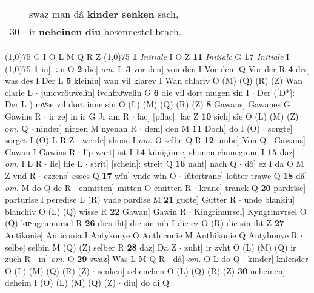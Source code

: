 \documentclass[8pt,a4paper,notitlepage]{article}
\begin{document}
\begin{table}[ht]
\begin{minipage}[t]{0.5\linewidth}
\begin{tabular}{rl}
 & swaz man dâ \textbf{kinder senken} sach,\\ 
30 & ir \textbf{neheinen} \textbf{diu} hosennestel brach.\\ 
\end{tabular}
\scriptsize
\line(1,0){75} \newline
G I O L M Q R Z \newline
\line(1,0){75} \newline
\textbf{1} \textit{Initiale} I O Z  \textbf{11} \textit{Initiale} G  \textbf{17} \textit{Initiale} I  \newline
\line(1,0){75} \newline
\textbf{1} in] ÷n O \textbf{2} die] \textit{om.} L \textbf{3} vor den] von den I Vor dem Q Vor der R \textbf{4} des] was des I Der L \textbf{5} kleiniu] wan vil klarev I Wan chlariv O (M) (Q) (R) (Z) Wan clarie L  $\cdot$ juncvröuwelîn] ivchfroͮwelin G \textbf{6} die vil dort mugen sin I  $\cdot$ Der ([D*]: Der L ) mvͦse vil dort inne sin O (L) (M) (Q) (R) (Z) \textbf{8} Gawans] Gawanes G Gawins R  $\cdot$ ir ze] in ir G Jr am R  $\cdot$ lac] [pflac]: lac Z \textbf{10} sich] sîe O (L) (M) (Z) o\textit{m. } Q  $\cdot$ ninder] nirgen M nyenan R  $\cdot$ dem] den M \textbf{11} Doch] do I (O)  $\cdot$ sorgte] sorget I (O) L R Z  $\cdot$ werde] shone I \textit{om.} O selbe Q R \textbf{12} umbe] Von Q  $\cdot$ Gawans] Gawan I Gawins R  $\cdot$ lîp wart] ist I \textbf{14} küniginne] shonen chuneginne I \textbf{15} daz] \textit{om.} I L R  $\cdot$ lie] hie L  $\cdot$ strît] [schein]: streit Q \textbf{16} naht] nach Q  $\cdot$ dô] ez I da O M Z vnd R  $\cdot$ ezzens] esses Q \textbf{17} wîn] vnde win O  $\cdot$ lûtertranc] loűter trawc Q \textbf{18} dâ] \textit{om.} M do Q de R  $\cdot$ enmitten] mitten O emitten R  $\cdot$ kranc] tranck Q \textbf{20} pardrîse] parturise I peredise L (R) vnde pardise M \textbf{21} guote] Gutter R  $\cdot$ unde blankiu] blanchiv O (L) (Q) wisse R \textbf{22} Gawan] Gawin R  $\cdot$ Kingrimursel] Kyngrimvrsel O (Q) kᵫngrumursel R \textbf{26} dies iht] die sin nih I die ez O (R) die sin iht Z \textbf{27} Antikonie] Anticonia I Antykonye O Anthiconie M Anthikonie Q Antybonye R  $\cdot$ selbe] selbin M (Q) (Z) selber R \textbf{28} daz] Da Z  $\cdot$ zuht] ir zvht O (L) (M) (Q) ir zuch R  $\cdot$ in] \textit{om.} O \textbf{29} swaz] Was L M Q R  $\cdot$ dâ] \textit{om.} O L do Q  $\cdot$ kinder] knîender O (L) (M) (Q) (R) (Z)  $\cdot$ senken] schenchen O (L) (Q) (R) (Z) \textbf{30} neheinen] deheim I (O) (L) (M) (Q) (Z)  $\cdot$ diu] do di Q \newline

\end{minipage}
\end{table}
\end{document}
